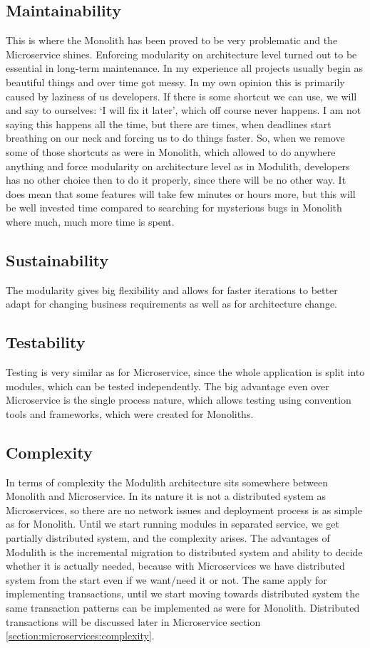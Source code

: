 \subsection{Maintainability}
This is where the Monolith has been proved to be very problematic and the Microservice shines. Enforcing modularity on architecture level turned out to be essential in long-term maintenance. In my experience all projects usually begin as beautiful things and over time got messy. In my own opinion this is primarily caused by laziness of us developers. If there is some shortcut we can use, we will and say to ourselves: `I will fix it later', which off course never happens. I am not saying this happens all the time, but there are times, when deadlines start breathing on our neck and forcing us to do things faster. So, when we remove some of those shortcuts as were in Monolith, which allowed to do anywhere anything and force modularity on architecture level as in Modulith, developers has no other choice then to do it properly, since there will be no other way. It does mean that some features will take few minutes or hours more, but this will be well invested time compared to searching for mysterious bugs in Monolith where much, much more time is spent.

\subsection{Sustainability}
The modularity gives big flexibility and allows for faster iterations to better adapt for changing business requirements as well as for architecture change.

\subsection{Testability}
Testing is very similar as for Microservice, since the whole application is split into modules, which can be tested independently. The big advantage even over Microservice is the single process nature, which allows testing using convention tools and frameworks, which were created for Monoliths.

\subsection{Complexity}
In terms of complexity the Modulith architecture sits somewhere between Monolith and Microservice. In its nature it is not a distributed system as Microservices, so there are no network issues and deployment process is as simple as for Monolith. Until we start running modules in separated service, we get partially distributed system, and the complexity arises. The advantages of Modulith is the incremental migration to distributed system and ability to decide whether it is actually needed, because with Microservices we have distributed system from the start even if we want/need it or not. The same apply for implementing transactions, until we start moving towards distributed system the same transaction patterns can be implemented as were for Monolith. Distributed transactions will be discussed later in Microservice section \ref{section:microservices:complexity}.
